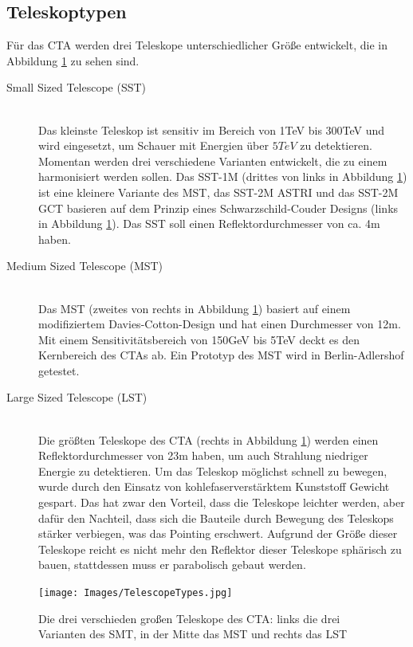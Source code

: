 \subsection{Teleskoptypen}
Für das CTA werden drei Teleskope unterschiedlicher Größe entwickelt, die in Abbildung \ref{img:TelescopeTypes} zu sehen sind.
\begin{description}
\item[Small Sized Telescope (SST)]\hfill \\
Das kleinste Teleskop ist sensitiv im Bereich von 1TeV bis 300TeV und wird eingesetzt, um Schauer mit Energien über $5\unit{TeV}$ zu detektieren. Momentan werden drei verschiedene Varianten entwickelt, die zu einem harmonisiert werden sollen. Das SST-1M (drittes von links in Abbildung \ref{img:TelescopeTypes}) ist eine kleinere Variante des MST, das SST-2M ASTRI und das SST-2M GCT basieren auf dem Prinzip eines Schwarzschild-Couder Designs (links in Abbildung \ref{img:TelescopeTypes}). Das SST soll einen Reflektordurchmesser von ca. 4m haben.
\item[Medium Sized Telescope (MST)]\hfill \\ 
Das MST (zweites von rechts in Abbildung \ref{img:TelescopeTypes}) basiert auf einem modifiziertem Davies-Cotton-Design und hat einen Durchmesser von 12m. Mit einem Sensitivitätsbereich von 150GeV bis 5TeV deckt es den Kernbereich des CTAs ab. Ein Prototyp des MST wird in Berlin-Adlershof getestet.
\item[Large Sized Telescope (LST)]\hfill \\
Die größten Teleskope des CTA (rechts in Abbildung \ref{img:TelescopeTypes}) werden einen Reflektordurchmesser von 23m haben, um auch Strahlung niedriger Energie zu detektieren. Um das Teleskop möglichst schnell zu bewegen, wurde durch den Einsatz von kohlefaserverstärktem Kunststoff Gewicht gespart. Das hat zwar den Vorteil, dass die Teleskope leichter werden, aber dafür den Nachteil, dass sich die Bauteile durch Bewegung des Teleskops stärker verbiegen, was das Pointing erschwert. Aufgrund der Größe dieser Teleskope reicht es nicht mehr den Reflektor dieser Teleskope sphärisch zu bauen, stattdessen muss er parabolisch gebaut werden.%
\end{description}
\begin{figure}[htbp]
\centering
\texttt{[image: Images/TelescopeTypes.jpg]}
\caption{Die drei verschieden großen Teleskope des CTA: links die drei Varianten des SMT, in der Mitte das MST und rechts das LST \cite{Flickr}}
\label{img:TelescopeTypes}
\end{figure}

